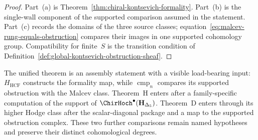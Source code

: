 \begin{proof}
Part~\textup{(a)} is
Theorem~\ref{thm:chiral-kontsevich-formality}.  Part~\textup{(b)} is
the single-wall component of the supported comparison assumed in the
statement.  Part~\textup{(c)} records the domains of the three source
classes; equation~\eqref{eq:malcev-rung-equals-obstruction} compares
their images in one supported cohomology group.  Compatibility for
finite~$S$ is the transition condition of
Definition~\ref{def:global-kontsevich-obstruction-sheaf}.
\end{proof}

\begin{remark}
\label{rem:kontsevich-unified-architectural-payload}
%
The unified theorem is an assembly statement with a visible load-bearing
input: $H_{\mathrm{HCF}}$ constructs the formality map, while
$\operatorname{cmp}_n$ compares its supported obstruction with the
Malcev class.  Theorem~H enters after a family-specific computation of
the support of $\ChirHoch^\bullet(\mathbf H_{\Delta_5})$.  Theorem~D
enters through its higher Hodge class after the scalar-diagonal package
and a map to the supported obstruction complex.  These two further
comparisons remain named hypotheses and preserve their distinct
cohomological degrees.
\end{remark}
